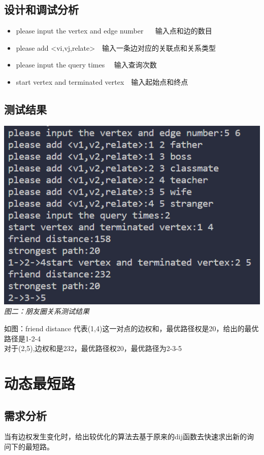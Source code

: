\documentclass[UTF8,a4paper]{article}
\begin{document}
\subsection{设计和调试分析}
\begin{itemize}
    \item please input the vertex and edge number ~~ 输入点和边的数目\\
    \item please add <vi,vj,relate>~~输入一条边对应的关联点和关系类型\\
    \item please input the query times ~~输入查询次数\\
    \item start vertex and terminated vertex~~输入起始点和终点\\
\end{itemize}
\subsection{测试结果}
\begin{center}
\includegraphics[scale=0.8]{friend.png}\\
\textit{图二：朋友圈关系测试结果}\\
\end{center}
如图：friend distance 代表(1,4)这一对点的边权和，最优路径权是20，给出的最优路径是1-2-4\\
对于(2,5),边权和是232，最优路径权20，最优路径为2-3-5
\newpage
\section{动态最短路}
\subsection{需求分析}
当有边权发生变化时，给出较优化的算法去基于原来的dij函数去快速求出新的询问下的最短路。\\
\end{document}

